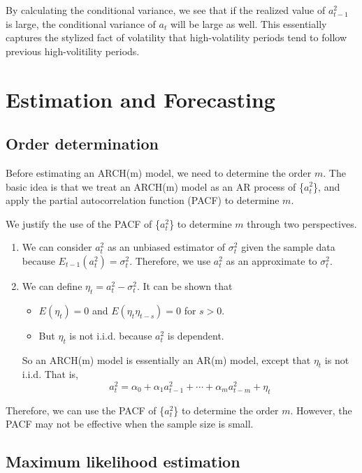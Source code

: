 \documentclass[a4paper,11pt]{article}
\begin{document}
By calculating the conditional variance, we see that if the realized
value of \(a^2_{t-1}\) is large, the conditional variance of \(a_t\) will
be large as well. This essentially captures the stylized fact of
volatility that high-volatility periods tend to follow previous
high-volitility periods.


\section{Estimation and Forecasting}
\label{sec:orgf72397b}

\subsection{Order determination}
\label{sec:org5d05a77}

Before estimating an ARCH(m) model, we need to determine the order
\(m\). The basic idea is that we treat an ARCH(m) model as an AR process
of \{\(a^2_t\)\}, and apply the partial autocorrelation function (PACF) to
determine \(m\).

We justify the use of the PACF of \{\(a^2_t\)\} to determine \(m\) through
two perspectives.
\begin{enumerate}
\item We can consider \(a^2_t\) as an unbiased estimator of \(\sigma^2_t\)
given the sample data because \(E_{t-1}(a^2_t) =
   \sigma^2_t\). Therefore, we use \(a^2_t\) as an approximate to
\(\sigma^2_t\).
\item We can define \(\eta_t = a^2_t - \sigma^2_t\). It can be shown that
\begin{itemize}
\item \(E(\eta_t) = 0\) and \(E(\eta_t \eta_{t-s})=0\) for \(s > 0\).
\item But \(\eta_t\) is not i.i.d. because \(a^2_t\) is dependent.
\end{itemize}
So an ARCH(m) model is essentially an AR(m) model, except
that \(\eta_t\) is not i.i.d. That is,
\[ a^2_t = \alpha_0 + \alpha_1 a^2_{t-1} + \cdots + \alpha_m
   a^2_{t-m} + \eta_t \]
\end{enumerate}

Therefore, we can use the PACF of \{\(a^2_t\)\} to determine the order
\(m\). However, the PACF may not be effective when the sample size is
small.


\subsection{Maximum likelihood estimation}
\label{sec:org3c5ee8a}
\end{document}
